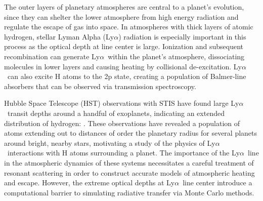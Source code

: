\documentclass{aastex63}
\newcommand\lya{Ly$\alpha$\ }
\begin{document}
The outer layers of planetary atmospheres are central to a planet's evolution, since they can shelter the lower atmosphere from high energy radiation and regulate the escape of gas into space. In atmospheres with thick layers of atomic hydrogen, stellar Lyman Alpha (Ly$\alpha$) radiation is especially important in this process as the optical depth at line center is large. Ionization and subsequent recombination can generate \lya within the planet's atmosphere, dissociating molecules in lower layers and causing heating by collisional de-excitation. \lya can also excite H atoms to the 2p state, creating a population of Balmer-line absorbers that can be observed via transmission spectroscopy.



Hubble Space Telescope (HST) observations with STIS have found large \lya transit depths around a handful of exoplanets, indicating an extended distribution of hydrogen: \citet{2003Natur.422..143V, 2012A&A...543L...4L, 2012A&A...547A..18E, 2015Natur.522..459E,  2017A&A...597A..26B, 2017A&A...599L...3B, 2017A&A...602A.106B, 2018A&A...620A.147B, 2019AJ....158...50W, 2019EPSC...13.1928L, 2020ApJ...888L..21G,2021arXiv210309864B}. These observations have revealed a population of atoms extending out to distances of order the planetary radius for several planets around bright, nearby stars, motivating a study of the physics of \lya interactions with H atoms surrounding a planet. The importance of the \lya line in the atmospheric dynamics of these systems necessitates a careful treatment of resonant scattering in order to construct accurate models of atmospheric heating and escape. However, the extreme optical depths at \lya line center introduce a computational barrier to simulating radiative transfer via Monte Carlo methods.
\end{document}
